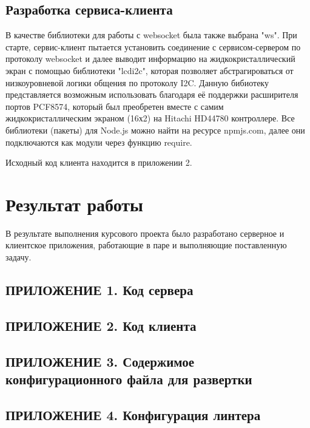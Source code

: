 \documentclass[a4paper, 12pt]{article}
\begin{document}
    \subsection*{Разработка сервиса-клиента}
    В качестве библиотеки для работы с websocket была также выбрана "ws". При старте, сервис-клиент пытается установить
    соединение с сервисом-сервером по протоколу websocket и далее выводит информацию на жидкокристаллический экран с помощью библиотеки
    "lcdi2c", которая позволяет абстрагироваться от низкоуровневой логики общения по протоколу I2C.
    Данную бибиотеку представляется возможным использовать благодаря её поддержки расширителя портов PCF8574, который был
    преобретен вместе с самим жидкокристаллическим экраном (16х2) на Hitachi HD44780 контроллере.
    Все библиотеки (пакеты) для Node.js можно найти на ресурсе npmjs.com, далее они подключаются как модули через функцию require.

    Исходный код клиента находится в приложении 2.

    \section*{Результат работы}
    В результате выполнения курсового проекта было разработано серверное и клиентское приложения,
    работающие в паре и выполняющие поставленную задачу.

    \newpage
    \subsection*{ПРИЛОЖЕНИЕ 1. Код сервера}
    

    \newpage
    \subsection*{ПРИЛОЖЕНИЕ 2. Код клиента}
    

    \newpage
    \subsection*{ПРИЛОЖЕНИЕ 3. Содержимое конфигурационного файла для развертки}
    

    \newpage
    \subsection*{ПРИЛОЖЕНИЕ 4. Конфигурация линтера}
    
\end{document}
